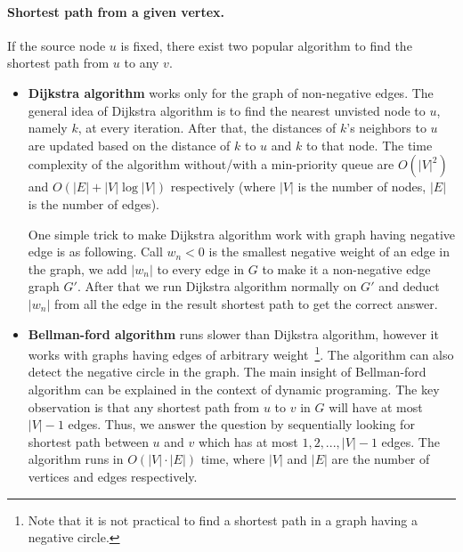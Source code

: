 \paragraph{Shortest path from a given vertex.} If the source node $u$ is fixed, there exist two popular algorithm to find the shortest path from $u$ to any $v$.
	\begin{itemize}
		\item {\bf Dijkstra algorithm} works only for the graph of non-negative edges. The general idea of Dijkstra algorithm is to find the nearest unvisted node to $u$, namely $k$, at every iteration. After that, the distances of $k$'s neighbors to $u$ are updated based on the distance of $k$ to $u$ and $k$ to that node. The time complexity of the algorithm without/with a min-priority queue are $O(|V|^2)$ and  $O(|E|+|V|\log|V|)$ respectively (where $|V|$ is the number of nodes, $|E|$ is the number of edges).

		One simple trick to make Dijkstra algorithm work with graph having negative edge is as following. Call $w_n < 0$ is the smallest negative weight of an edge in the graph, we add $|w_n|$ to every edge in $G$ to make it a non-negative edge graph $G'$. After that we run Dijkstra algorithm normally on $G'$ and deduct $|w_n|$ from all the edge in the result shortest path to get the correct answer.

		\item {\bf Bellman-ford algorithm} runs slower than Dijkstra algorithm, however it works with graphs having edges of arbitrary weight~\footnote{Note that it is not practical to find a shortest path in a graph having a negative circle.}. The algorithm can also detect the negative circle in the graph. The main insight of Bellman-ford algorithm can be explained in the context of dynamic programing. 		
		The key observation is that any shortest path from $u$ to $v$ in $G$ will have at most $|V|−1$ edges. Thus, we answer the question by sequentially looking for shortest path between $u$ and $v$ which has at most $1, 2, ..., |V|-1$ edges. The algorithm runs in  $O(|V|\cdot |E|)$ time, where $|V|$ and $|E|$ are the number of vertices and edges respectively.
	\end{itemize}

